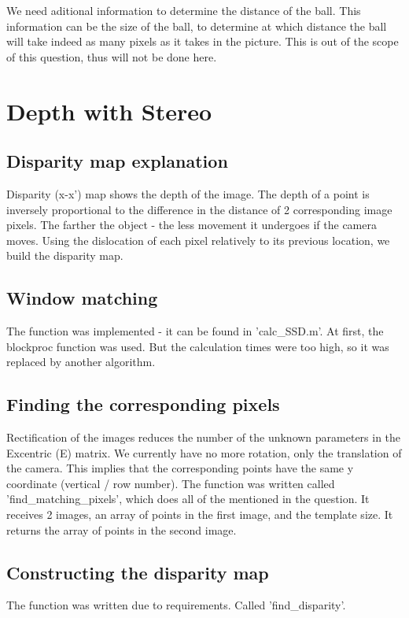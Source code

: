 \documentclass[a4paper]{iacas}
\begin{document}
We need aditional information to determine the distance of the ball. This information can be the size of the ball, to determine at which distance the ball will take indeed as many pixels as it takes in the picture. This is out of the scope of this question, thus will not be done here. 





\newpage
\section{Depth with Stereo}
\subsection{Disparity map explanation}
Disparity (x-x') map shows the depth of the image. The depth of a point is inversely proportional to the difference in the distance of 2 corresponding image pixels. The farther the object - the less movement it undergoes if the camera moves. Using the dislocation of each pixel relatively to its previous location, we build the disparity map. 



\subsection{Window matching}
The function was implemented - it can be found in 'calc\_SSD.m'. At first, the blockproc function was used. But the calculation times were too high, so it was replaced by another algorithm.


\subsection{Finding the corresponding pixels}
Rectification of the images reduces the number of the unknown parameters in the Excentric (E) matrix. We currently have no more rotation, only the translation of the camera. This implies that the corresponding points have the same y coordinate (vertical / row number).
\newline
The function was written called 'find\_matching\_pixels', which does all of the mentioned in the question. It receives 2 images, an array of points in the first image, and the template size. It returns the array of points in the second image.

\subsection{Constructing the disparity map}
The function was written due to requirements. Called 'find\_disparity'.
\end{document}

